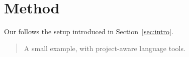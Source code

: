 \section{Method}\label{sec:method}

Our  follows the setup
introduced in Section~\ref{sec:intro}.


\begin{quote}
  A small example, with project-aware language tools.
\end{quote}

